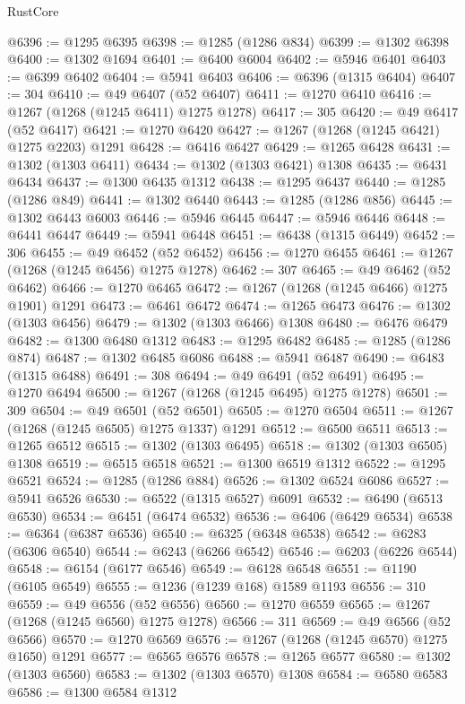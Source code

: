 \begin{lexlean}{RustCore}
\begin{coremodule}
@6396 := @1295 @6395
@6398 := @1285 (@1286 @834)
@6399 := @1302 @6398
@6400 := @1302 @1694
@6401 := @6400 @6004
@6402 := @5946 @6401
@6403 := @6399 @6402
@6404 := @5941 @6403
@6406 := @6396 (@1315 @6404)
@6407 := 304
@6410 := @49 @6407 (@52 @6407)
@6411 := @1270 @6410
@6416 := @1267 (@1268 (@1245 @6411) @1275 @1278)
@6417 := 305
@6420 := @49 @6417 (@52 @6417)
@6421 := @1270 @6420
@6427 := @1267 (@1268 (@1245 @6421) @1275 @2203) @1291
@6428 := @6416 @6427
@6429 := @1265 @6428
@6431 := @1302 (@1303 @6411)
@6434 := @1302 (@1303 @6421) @1308
@6435 := @6431 @6434
@6437 := @1300 @6435 @1312
@6438 := @1295 @6437
@6440 := @1285 (@1286 @849)
@6441 := @1302 @6440
@6443 := @1285 (@1286 @856)
@6445 := @1302 @6443 @6003
@6446 := @5946 @6445
@6447 := @5946 @6446
@6448 := @6441 @6447
@6449 := @5941 @6448
@6451 := @6438 (@1315 @6449)
@6452 := 306
@6455 := @49 @6452 (@52 @6452)
@6456 := @1270 @6455
@6461 := @1267 (@1268 (@1245 @6456) @1275 @1278)
@6462 := 307
@6465 := @49 @6462 (@52 @6462)
@6466 := @1270 @6465
@6472 := @1267 (@1268 (@1245 @6466) @1275 @1901) @1291
@6473 := @6461 @6472
@6474 := @1265 @6473
@6476 := @1302 (@1303 @6456)
@6479 := @1302 (@1303 @6466) @1308
@6480 := @6476 @6479
@6482 := @1300 @6480 @1312
@6483 := @1295 @6482
@6485 := @1285 (@1286 @874)
@6487 := @1302 @6485 @6086
@6488 := @5941 @6487
@6490 := @6483 (@1315 @6488)
@6491 := 308
@6494 := @49 @6491 (@52 @6491)
@6495 := @1270 @6494
@6500 := @1267 (@1268 (@1245 @6495) @1275 @1278)
@6501 := 309
@6504 := @49 @6501 (@52 @6501)
@6505 := @1270 @6504
@6511 := @1267 (@1268 (@1245 @6505) @1275 @1337) @1291
@6512 := @6500 @6511
@6513 := @1265 @6512
@6515 := @1302 (@1303 @6495)
@6518 := @1302 (@1303 @6505) @1308
@6519 := @6515 @6518
@6521 := @1300 @6519 @1312
@6522 := @1295 @6521
@6524 := @1285 (@1286 @884)
@6526 := @1302 @6524 @6086
@6527 := @5941 @6526
@6530 := @6522 (@1315 @6527) @6091
@6532 := @6490 (@6513 @6530)
@6534 := @6451 (@6474 @6532)
@6536 := @6406 (@6429 @6534)
@6538 := @6364 (@6387 @6536)
@6540 := @6325 (@6348 @6538)
@6542 := @6283 (@6306 @6540)
@6544 := @6243 (@6266 @6542)
@6546 := @6203 (@6226 @6544)
@6548 := @6154 (@6177 @6546)
@6549 := @6128 @6548
@6551 := @1190 (@6105 @6549)
@6555 := @1236 (@1239 @168) @1589 @1193
@6556 := 310
@6559 := @49 @6556 (@52 @6556)
@6560 := @1270 @6559
@6565 := @1267 (@1268 (@1245 @6560) @1275 @1278)
@6566 := 311
@6569 := @49 @6566 (@52 @6566)
@6570 := @1270 @6569
@6576 := @1267 (@1268 (@1245 @6570) @1275 @1650) @1291
@6577 := @6565 @6576
@6578 := @1265 @6577
@6580 := @1302 (@1303 @6560)
@6583 := @1302 (@1303 @6570) @1308
@6584 := @6580 @6583
@6586 := @1300 @6584 @1312

\end{coremodule}
\end{lexlean}
